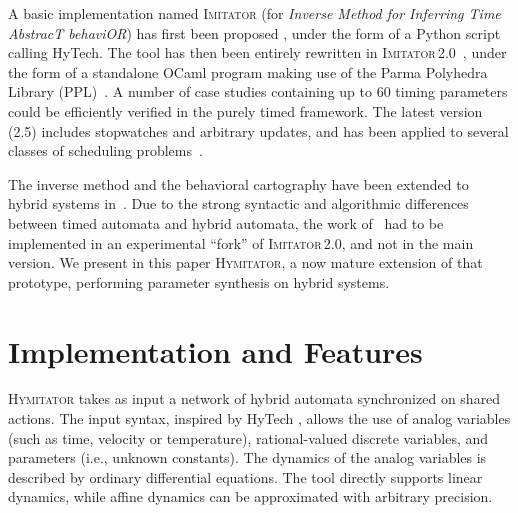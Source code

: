 \documentclass{llncs}
\newcommand{\hytech}{{\sc HyTech}}
\newcommand{\imitator}{\textsc{Imitator}}
\newcommand{\hymitator}{\textsc{Hymitator}}
\newcommand{\ocaml}{OCaml}
\newcommand{\python}{Python}
\newcommand{\commentaire}[1]{}
\begin{document}
A basic implementation named \imitator{} (for \emph{Inverse Method for Inferring Time AbstracT behaviOR}) has first been proposed%
, under the form of a \python{} script calling \hytech{}.
The tool has then been entirely rewritten in \imitator{}\,2.0~\cite{and10}, under the form of a standalone \ocaml{} program making use of the Parma Polyhedra Library (PPL)~\cite{bhz08}.
A number of case studies containing up to 60 timing parameters could be efficiently verified in the purely timed framework.
The latest version (2.5) includes stopwatches and arbitrary updates, and has been applied to several classes of scheduling problems~\cite{afks}.

The inverse method and the behavioral cartography have been extended to hybrid systems in~\cite{FK11}.
Due to the strong syntactic and algorithmic differences between timed automata and hybrid automata, the work of~\cite{FK11} had to be implemented in an experimental ``fork'' of \imitator{}\,2.0, and not in the main version.
We present in this paper \hymitator{}, a now mature extension of that prototype, performing parameter synthesis on hybrid systems.





% 
% 
% 
% 
% 

\section{Implementation and Features}

\hymitator{} takes as input a network of hybrid automata synchronized on shared actions.
The input syntax, inspired by \hytech{}%
, allows the use of analog variables (such as time, velocity or temperature), rational-valued discrete variables, and parameters (i.e., unknown constants). The dynamics of the analog variables is described by ordinary differential equations. The tool directly supports linear dynamics, while affine dynamics can be approximated with arbitrary precision.
\end{document}
